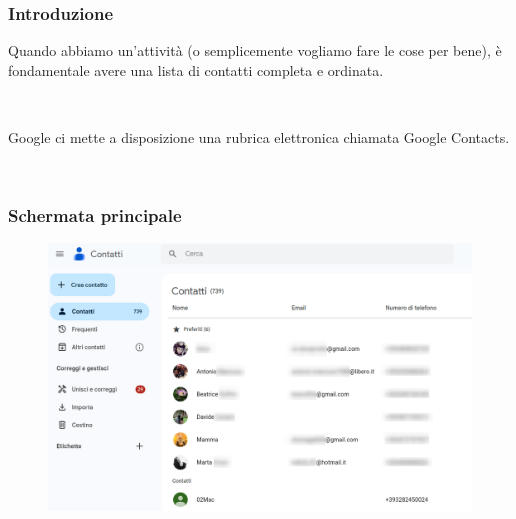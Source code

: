 \documentclass[handout]{beamer}
\begin{document}
\begin{frame}
\frametitle{Introduzione}
Quando abbiamo un'attività (o semplicemente vogliamo fare le cose per bene), è fondamentale avere una lista di contatti \alert{completa} e \alert{ordinata}.\pause

~

Google ci mette a disposizione una \alert{rubrica elettronica} chiamata Google Contacts.

~

\end{frame}



\begin{frame}
\frametitle{Schermata principale}
\begin{figure}
  \includegraphics[width=\columnwidth]{img/contatti2.png}
\end{figure}
\end{frame}
\end{document}
